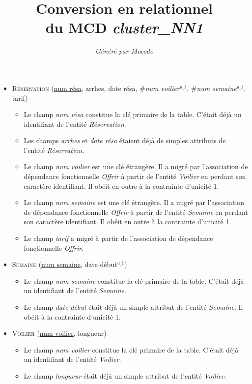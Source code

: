 \documentclass[a4paper]{article}
\title{Conversion en relationnel\\du MCD \emph{cluster\_NN1}}
\author{\emph{Généré par Mocodo}}
\newcommand{\relat}[1]{\textsc{#1}}
\newcommand{\attr}[1]{#1}
\newcommand{\prim}[1]{\uline{#1}}
\newcommand{\foreign}[1]{\#\textsl{#1}}
\begin{document}
\maketitle

\begin{itemize}
  \item \relat{Réservation} (\prim{num résa}, \attr{arrhes}, \attr{date résa}, \foreign{num voilier}$^{u\_1}$, \foreign{num semaine}$^{u\_1}$, \attr{tarif})
  \begin{itemize}
    \item Le champ \emph{num résa} constitue la clé primaire de la table. C'était déjà un identifiant de l'entité \emph{Réservation}.
    \item Les champs \emph{arrhes} et \emph{date résa} étaient déjà de simples attributs de l'entité \emph{Réservation}.
    \item Le champ \emph{num voilier} est une clé étrangère. Il a migré par l'association de dépendance fonctionnelle \emph{Offrir} à partir de l'entité \emph{Voilier} en perdant son caractère identifiant. Il obéit en outre à la contrainte d'unicité 1.
    \item Le champ \emph{num semaine} est une clé étrangère. Il a migré par l'association de dépendance fonctionnelle \emph{Offrir} à partir de l'entité \emph{Semaine} en perdant son caractère identifiant. Il obéit en outre à la contrainte d'unicité 1.
    \item Le champ \emph{tarif} a migré à partir de l'association de dépendance fonctionnelle \emph{Offrir}.
  \end{itemize}

  \item \relat{Semaine} (\prim{num semaine}, \attr{date début}$^{u\_1}$)
  \begin{itemize}
    \item Le champ \emph{num semaine} constitue la clé primaire de la table. C'était déjà un identifiant de l'entité \emph{Semaine}.
    \item Le champ \emph{date début} était déjà un simple attribut de l'entité \emph{Semaine}. Il obéit à la contrainte d'unicité 1.
  \end{itemize}

  \item \relat{Voilier} (\prim{num voilier}, \attr{longueur})
  \begin{itemize}
    \item Le champ \emph{num voilier} constitue la clé primaire de la table. C'était déjà un identifiant de l'entité \emph{Voilier}.
    \item Le champ \emph{longueur} était déjà un simple attribut de l'entité \emph{Voilier}.
  \end{itemize}

\end{itemize}
\end{document}
